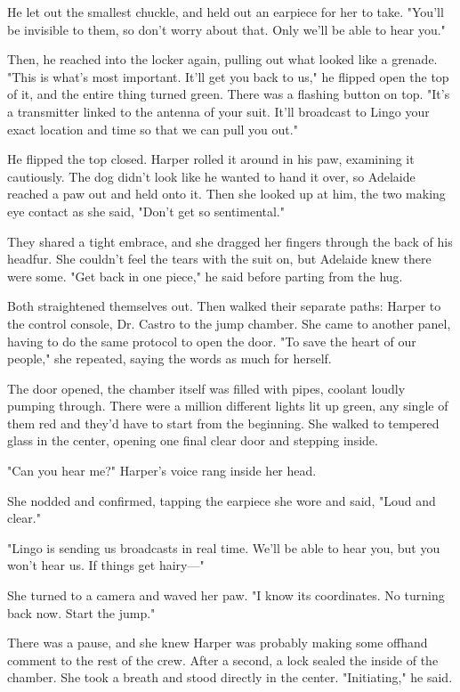 He let out the smallest chuckle, and held out an earpiece for her to take. "You'll be invisible to them, so don't worry about that. Only we'll be able to hear you."

Then, he reached into the locker again, pulling out what looked like a grenade. "This is what's most important. It'll get you back to us," he flipped open the top of it, and the entire thing turned green. There was a flashing button on top. "It's a transmitter linked to the antenna of your suit. It'll broadcast to Lingo your exact location and time so that we can pull you out."

He flipped the top closed. Harper rolled it around in his paw, examining it cautiously. The dog didn't look like he wanted to hand it over, so Adelaide reached a paw out and held onto it. Then she looked up at him, the two making eye contact as she said, "Don't get so sentimental."

They shared a tight embrace, and she dragged her fingers through the back of his headfur. She couldn't feel the tears with the suit on, but Adelaide knew there were some. "Get back in one piece," he said before parting from the hug.

Both straightened themselves out. Then walked their separate paths: Harper to the control console, Dr. Castro to the jump chamber. She came to another panel, having to do the same protocol to open the door. "To save the heart of our people," she repeated, saying the words as much for herself.

The door opened, the chamber itself was filled with pipes, coolant loudly pumping through. There were a million different lights lit up green, any single of them red and they'd have to start from the beginning. She walked to tempered glass in the center, opening one final clear door and stepping inside.

"Can you hear me?" Harper's voice rang inside her head.

She nodded and confirmed, tapping the earpiece she wore and said, "Loud and clear."

"Lingo is sending us broadcasts in real time. We'll be able to hear you, but you won't hear us. If things get hairy---"

She turned to a camera and waved her paw. "I know its coordinates. No turning back now. Start the jump."

There was a pause, and she knew Harper was probably making some offhand comment to the rest of the crew. After a second, a lock sealed the inside of the chamber. She took a breath and stood directly in the center. "Initiating," he said.

